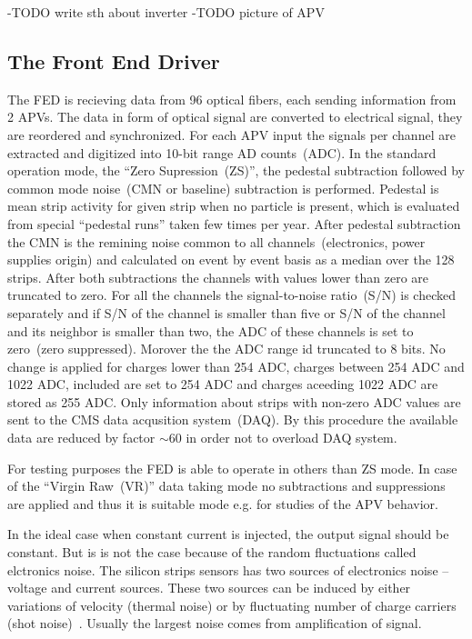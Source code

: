 -TODO write sth about inverter
-TODO picture of APV

\subsection{The Front End Driver}

The FED is recieving data from 96 optical fibers, each sending information from 2 APVs. The data in form of optical signal are converted to electrical signal, they are reordered and synchronized. For each APV input the signals per channel are extracted and digitized into 10-bit range AD counts~(ADC). In the standard operation mode, the ``Zero Supression~(ZS)'', the pedestal subtraction followed by common mode noise~(CMN or baseline) subtraction is performed. Pedestal is mean strip activity for given strip when no particle is present, which is evaluated from special ``pedestal runs'' taken few times per year. After pedestal subtraction the CMN is the remining noise common to all channels~(electronics, power supplies origin) and calculated on event by event basis as a median over the 128 strips. After both subtractions the channels with values lower than zero are truncated to zero. For all the channels the signal-to-noise ratio~(S/N) is checked separately and if S/N of the channel is smaller than five or S/N of the channel and its neighbor is smaller than two, the ADC of these channels is set to zero~(zero suppressed). Morover the the ADC range id truncated to 8 bits. No change is applied for charges lower than 254 ADC, charges between 254 ADC and 1022 ADC, included are set to 254 ADC and charges aceeding 1022 ADC are stored as 255 ADC. Only information about strips with non-zero ADC values are sent to the CMS data acqusition system~(DAQ). By this procedure the available data are reduced by factor $\sim$60 in order not to overload DAQ system.

For testing purposes the FED is able to operate in others than ZS mode. In case of the ``Virgin Raw~(VR)'' data taking mode no subtractions and suppressions are applied and thus it is suitable mode e.g. for studies of the APV behavior.

In the ideal case when constant current is injected, the output signal should be constant. But is is not the case because of the random fluctuations called elctronics noise. The silicon strips sensors has two sources of electronics noise -- voltage and current sources. These two sources can be induced by either variations of velocity (thermal noise) or by fluctuating number of charge carriers (shot noise)~\cite{website:noise}. Usually the largest noise comes from amplification of signal. 

